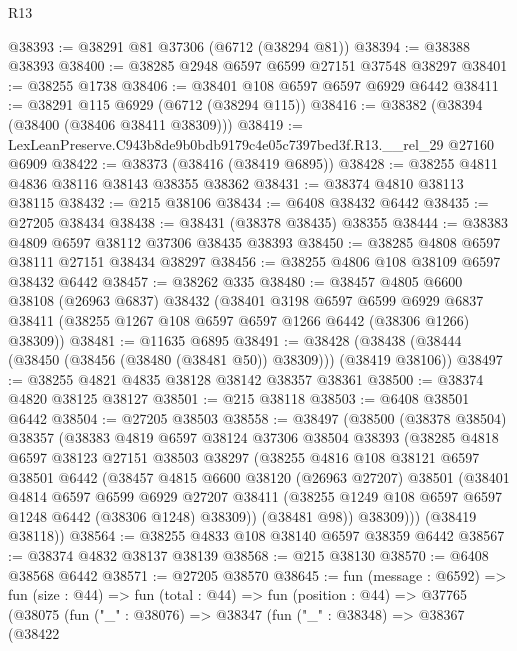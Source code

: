 \begin{lexlean}{R13}
\begin{coremodule}
@38393 := @38291 @81 @37306 (@6712 (@38294 @81))
@38394 := @38388 @38393
@38400 := @38285 @2948 @6597 @6599 @27151 @37548 @38297
@38401 := @38255 @1738
@38406 := @38401 @108 @6597 @6597 @6929 @6442
@38411 := @38291 @115 @6929 (@6712 (@38294 @115))
@38416 := @38382 (@38394 (@38400 (@38406 @38411 @38309)))
@38419 := LexLeanPreserve.C943b8de9b0bdb9179c4e05c7397bed3f.R13.__rel_29 @27160 @6909
@38422 := @38373 (@38416 (@38419 @6895))
@38428 := @38255 @4811 @4836 @38116 @38143 @38355 @38362
@38431 := @38374 @4810 @38113 @38115
@38432 := @215 @38106
@38434 := @6408 @38432 @6442
@38435 := @27205 @38434
@38438 := @38431 (@38378 @38435) @38355
@38444 := @38383 @4809 @6597 @38112 @37306 @38435 @38393
@38450 := @38285 @4808 @6597 @38111 @27151 @38434 @38297
@38456 := @38255 @4806 @108 @38109 @6597 @38432 @6442
@38457 := @38262 @335
@38480 := @38457
    @4805
    @6600
    @38108
    (@26963 @6837)
    @38432
    (@38401
      @3198
      @6597
      @6599
      @6929
      @6837
      @38411
      (@38255 @1267 @108 @6597 @6597 @1266 @6442 (@38306 @1266) @38309))
@38481 := @11635 @6895
@38491 := @38428 (@38438 (@38444 (@38450 (@38456 (@38480 (@38481 @50)) @38309))) (@38419 @38106))
@38497 := @38255 @4821 @4835 @38128 @38142 @38357 @38361
@38500 := @38374 @4820 @38125 @38127
@38501 := @215 @38118
@38503 := @6408 @38501 @6442
@38504 := @27205 @38503
@38558 := @38497
    (@38500
      (@38378 @38504)
      @38357
      (@38383
        @4819
        @6597
        @38124
        @37306
        @38504
        @38393
        (@38285
          @4818
          @6597
          @38123
          @27151
          @38503
          @38297
          (@38255
            @4816
            @108
            @38121
            @6597
            @38501
            @6442
            (@38457
              @4815
              @6600
              @38120
              (@26963 @27207)
              @38501
              (@38401
                @4814
                @6597
                @6599
                @6929
                @27207
                @38411
                (@38255 @1249 @108 @6597 @6597 @1248 @6442 (@38306 @1248) @38309))
              (@38481 @98))
            @38309)))
      (@38419 @38118))
@38564 := @38255 @4833 @108 @38140 @6597 @38359 @6442
@38567 := @38374 @4832 @38137 @38139
@38568 := @215 @38130
@38570 := @6408 @38568 @6442
@38571 := @27205 @38570
@38645 := fun (message : @6592) =>
  fun (size : @44) =>
  fun (total : @44) =>
  fun (position : @44) =>
  @37765
    (@38075
      (fun ("_" : @38076) =>
      @38347
        (fun ("_" : @38348) =>
        @38367
          (@38422

\end{coremodule}
\end{lexlean}
